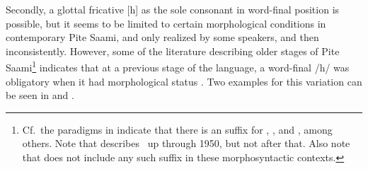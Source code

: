 Secondly, a glottal fricative [h] as the sole consonant in word-final position is possible, but it seems to be limited to certain morphological conditions in contemporary Pite Saami, and only realized by some speakers, and then inconsistently. 
However, some of the literature describing older stages of Pite Saami\footnote{Cf.~the paradigms in \citet[150-159]{Lehtiranta1992} indicate that there is an  suffix for , ,  and , among others. Note that \citet{Lehtiranta1992} describes \PS\ up through 1950, but not after that. Also note that \citet[104,120]{Lagercrantz1926} does not include any such suffix in these morphosyntactic contexts.} indicates that at a previous stage of the language, a word-final /h/ was obligatory when it had morphological status%
. Two examples for this variation can be seen in  and .
\ea\label{work2SGPRS}
\z
\ea\label{fishDIMGENSG}
\z



